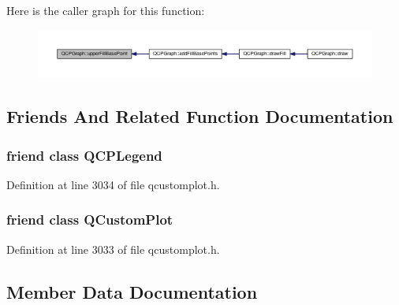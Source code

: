 Here is the caller graph for this function\+:\nopagebreak
\begin{figure}[H]
\begin{center}
\leavevmode
\includegraphics[width=350pt]{class_q_c_p_graph_a363d066c179e0f46cc93c12bafb0bfba_icgraph}
\end{center}
\end{figure}




\subsection{Friends And Related Function Documentation}
\hypertarget{class_q_c_p_graph_a8429035e7adfbd7f05805a6530ad5e3b}{}
\subsubsection[{Q\+C\+P\+Legend}]{\setlength{\rightskip}{0pt plus 5cm}friend class {\bf Q\+C\+P\+Legend}\hspace{0.3cm}{\ttfamily [friend]}}\label{class_q_c_p_graph_a8429035e7adfbd7f05805a6530ad5e3b}


Definition at line 3034 of file qcustomplot.\+h.

\hypertarget{class_q_c_p_graph_a1cdf9df76adcfae45261690aa0ca2198}{}
\subsubsection[{Q\+Custom\+Plot}]{\setlength{\rightskip}{0pt plus 5cm}friend class {\bf Q\+Custom\+Plot}\hspace{0.3cm}{\ttfamily [friend]}}\label{class_q_c_p_graph_a1cdf9df76adcfae45261690aa0ca2198}


Definition at line 3033 of file qcustomplot.\+h.



\subsection{Member Data Documentation}
\hypertarget{class_q_c_p_graph_aa951e78aeba714cf443be6da2e52502e}{}
